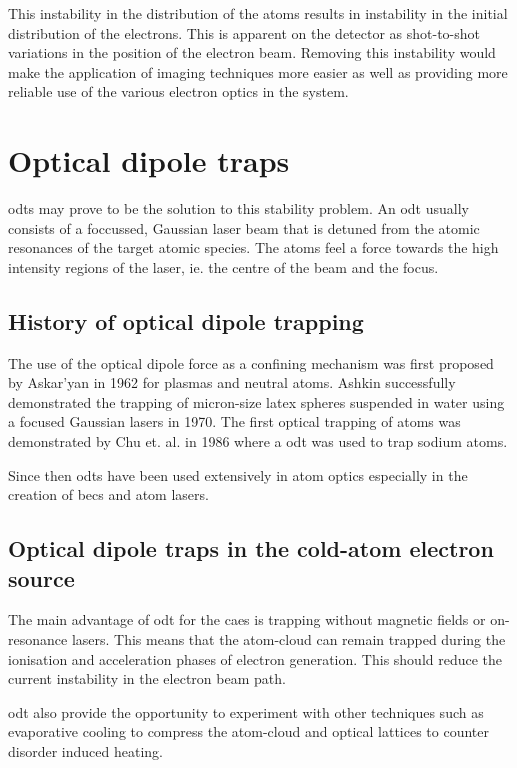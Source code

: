 This instability in the distribution of the atoms results in instability in the initial distribution of the electrons. This is apparent on the detector as shot-to-shot variations in the position of the electron beam. Removing this instability would make the application of imaging techniques more easier as well as providing more reliable use of the various electron optics in the system.

\section{Optical dipole traps}

\Glspl{odt} may prove to be the solution to this stability problem. An \gls{odt} usually consists of a foccussed, Gaussian laser beam that is detuned from the atomic resonances of the target atomic species. The atoms feel a force towards the high intensity regions of the laser, ie. the centre of the beam and the focus.

\subsection{History of optical dipole trapping}
The use of the optical dipole force as a confining mechanism was first proposed by Askar'yan in 1962\cite{askaryan_effects_1962} for plasmas and neutral atoms. Ashkin successfully demonstrated the trapping of micron-size latex spheres suspended in water using a focused Gaussian lasers in 1970\cite{ashkin_acceleration_1970}. The first optical trapping of atoms was demonstrated by Chu et. al. in 1986\cite{chu_experimental_1986} where a \gls{odt} was used to trap sodium atoms.

Since then \glspl{odt} have been used extensively in atom optics especially in the creation of \glspl{bec} and atom lasers.

\subsection{Optical dipole traps in the cold-atom electron source}

The main advantage of \gls{odt} for the \gls{caes} is trapping without magnetic fields or on-resonance lasers. This means that the atom-cloud can remain trapped during the ionisation and acceleration phases of electron generation. This should reduce the current instability in the electron beam path.

\Gls{odt} also provide the opportunity to experiment with other techniques such as evaporative cooling to compress the atom-cloud and optical lattices\cite{fallani_bose-einstein_2005} to counter disorder induced heating. 

